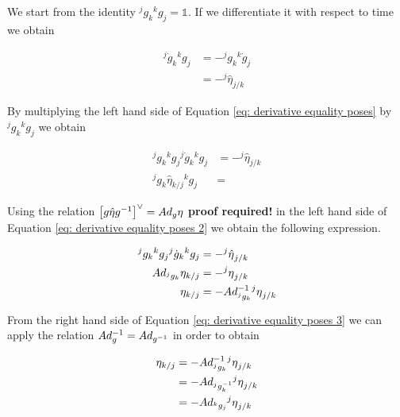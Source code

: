\documentclass[12pt,a4paper]{book}
\begin{document}
We start from the identity ${^jg_k}{^kg_j} = \mathbb{1}$. If we differentiate it with respect to time we obtain 

\begin{equation}\label{eq: derivative equality poses}
\begin{aligned}
	{^j\dot{g}_k}{^kg_j} 	&= - {^jg_k}{^k\dot{g}_j} \\
							&= - {^j} \hat{\eta}_{j/k}
\end{aligned}
\end{equation}


By multiplying the left hand side of Equation \eqref{eq: derivative equality poses} by ${^jg_k}{^kg_j}$ we obtain


\begin{equation}\label{eq: derivative equality poses 2}
\begin{aligned}
	{^jg_k}{^kg_j}{^j\dot{g}_k}{^kg_j} 	&= - {^j} \hat{\eta}_{j/k}\\
	{^jg_k} \hat{\eta}_{k/j}{^kg_j}		&= 
\end{aligned}
\end{equation}

Using the relation $\left[ g \hat{\eta} g ^{-1} \right]^\vee = Ad_g \eta $ \color{red}\textbf{proof required!}\color{black} in the left hand side of Equation \eqref{eq: derivative equality poses 2} we obtain the following expression.

\begin{equation}\label{eq: derivative equality poses 3}
\begin{aligned}
	{^jg_k}{^kg_j}{^j\dot{g}_k}{^kg_j} 	&= - {^j \hat{\eta}}_{j/k}\\
	Ad_{^jg_k} \eta_{k/j}					&= - {^j {\eta}}_{j/k} \\
	\eta_{k/j} &= - Ad_{^jg_k} ^{-1} {^j {\eta}}_{j/k}
\end{aligned}
\end{equation}

From the right hand side of Equation \eqref{eq: derivative equality poses 3} we can apply the relation $Ad_g ^{-1} = Ad_{g^{-1}} $ in order to obtain

\begin{equation}\label{eq: derivative equality poses 4}
\begin{aligned}
	\eta_{k/j} 	&= - Ad_{^jg_k} ^{-1} {^j {\eta}}_{j/k} \\
				&= - Ad_{^jg_k^{-1}}  {^j {\eta}}_{j/k} \\
				&= - Ad_{^kg_j}  {^j {\eta}}_{j/k} \\
\end{aligned}
\end{equation}
\end{document}
